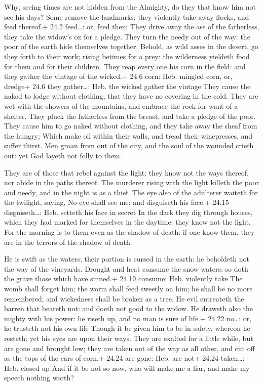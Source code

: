  Why, seeing times are not hidden from the Almighty, do they
that know him not see his days?  Some remove the landmarks;
they violently take away flocks, and feed thereof.+ 24.2 feed\ldots: or,
feed them  They drive away the ass of the fatherless, they
take the widow's ox for a pledge.  They turn the needy out
of the way: the poor of the earth hide themselves together. 
Behold, as wild asses in the desert, go they forth to their work; rising
betimes for a prey: the wilderness yieldeth food for them and for their
children.  They reap every one his corn in the field: and
they gather the vintage of the wicked.+ 24.6 corn: Heb. mingled corn,
or, dredge+ 24.6 they gather\ldots: Heb. the wicked gather the vintage
 They cause the naked to lodge without clothing, that they
have no covering in the cold.  They are wet with the showers
of the mountains, and embrace the rock for want of a shelter.
 They pluck the fatherless from the breast, and take a
pledge of the poor.  They cause him to go naked without
clothing, and they take away the sheaf from the hungry; 
Which make oil within their walls, and tread their winepresses, and
suffer thirst.  Men groan from out of the city, and the
soul of the wounded crieth out: yet God layeth not folly to them.

 They are of those that rebel against the light; they know
not the ways thereof, nor abide in the paths thereof.  The
murderer rising with the light killeth the poor and needy, and in the
night is as a thief.  The eye also of the adulterer waiteth
for the twilight, saying, No eye shall see me: and disguiseth his face.+
24.15 disguiseth\ldots: Heb. setteth his face in secret  In
the dark they dig through houses, which they had marked for themselves
in the daytime: they know not the light.  For the morning
is to them even as the shadow of death: if one know them, they are in
the terrors of the shadow of death.

 He is swift as the waters; their portion is cursed in the
earth: he beholdeth not the way of the vineyards.  Drought
and heat consume the snow waters: so doth the grave those which have
sinned.+ 24.19 consume: Heb. violently take  The womb shall
forget him; the worm shall feed sweetly on him; he shall be no more
remembered; and wickedness shall be broken as a tree.  He
evil entreateth the barren that beareth not: and doeth not good to the
widow.  He draweth also the mighty with his power: he
riseth up, and no man is sure of life.+ 24.22 no\ldots: or, he trusteth
not his own life  Though it be given him to be in safety,
whereon he resteth; yet his eyes are upon their ways.  They
are exalted for a little while, but are gone and brought low; they are
taken out of the way as all other, and cut off as the tops of the ears
of corn.+ 24.24 are gone: Heb. are not+ 24.24 taken\ldots: Heb. closed
up  And if it be not so now, who will make me a liar, and
make my speech nothing worth?

